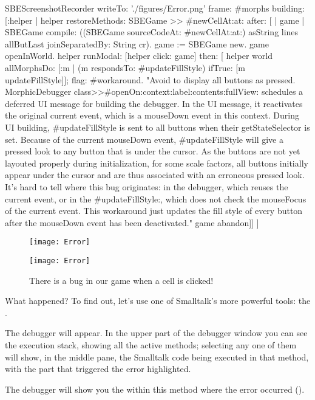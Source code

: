 \documentclass[a4paper,10pt,twoside]{book}
\begin{document}
\begin{ExecuteSmalltalkScript}
SBEScreenshotRecorder writeTo: './figures/Error.png' frame: #morphs building: [:helper |
	helper restoreMethods: {SBEGame >> #newCellAt:at:} after: [
		| game |
		SBEGame compile: ((SBEGame sourceCodeAt: #newCellAt:at:) asString
			lines allButLast joinSeparatedBy: String cr).
		game := SBEGame new.
		game openInWorld.
		helper
			runModal: [helper click: game]
			then: [
				helper world
					allMorphsDo: [:m | (m respondsTo: #updateFillStyle) ifTrue: [m updateFillStyle]];
					flag: #workaround. "Avoid to display all buttons as pressed.
						MorphicDebugger class>>#openOn:context:label:contents:fullView: schedules a deferred UI message for building the debugger. In the UI message, it reactivates the original current event, which is a mouseDown event in this context. During UI building, #updateFillStyle is sent to all buttons when their getStateSelector is set. Because of the current mouseDown event, #updateFillStyle will give a pressed look to any button that is under the cursor. As the buttons are not yet layouted properly during initialization, for some scale factors, all buttons initially appear under the cursor and are thus associated with an erroneous pressed look. It's hard to tell where this bug originates: in the debugger, which reuses the current event, or in the #updateFillStyle:, which does not check the mouseFocus of the current event. This workaround just updates the fill style of every button after the mouseDown event has been deactivated."
				game abandon]]
]
\end{ExecuteSmalltalkScript}
\begin{figure}[ht]
\ifluluelse
	{\centerline{\texttt{[image: Error]}}}
	{\centerline{\texttt{[image: Error]}}}
\caption{There is a bug in our game when a cell is clicked!
\label{fig:quintoError}}
\end{figure}

\noindent
What happened?
To find out, let's use one of Smalltalk's more powerful tools: the .

The debugger will appear.
In the upper part of the debugger window you can see the execution stack, showing all the active methods; selecting any one of them will show, in the middle pane, the Smalltalk code being executed in that method, with the part that triggered the error highlighted.

The debugger will show you the  within this method where the error occurred ().
\end{document}
